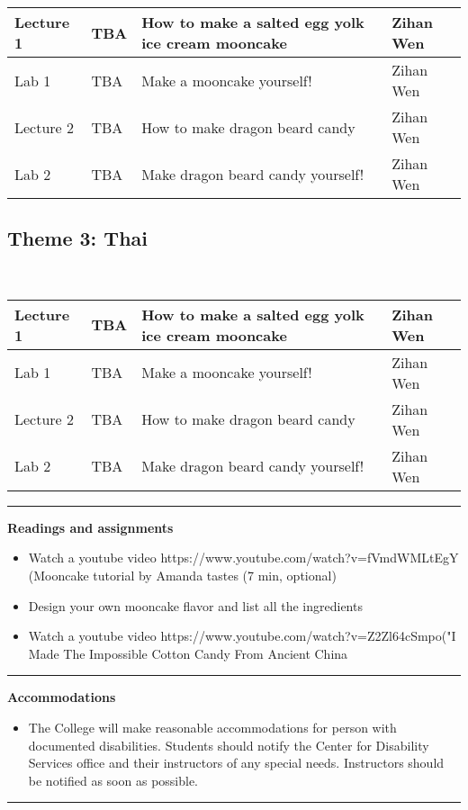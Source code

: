 \documentclass{article}
\begin{document}
 \vspace{0.5em} \begin{tabular}{|l|l|l|l|}
\hline 
Lecture 1 & TBA & How to make a salted egg yolk ice cream mooncake & Zihan Wen\\
\hline
Lab 1 & TBA & Make a mooncake yourself!& Zihan Wen\\
\hline
Lecture 2 & TBA & How to make dragon beard candy & Zihan Wen\\
\hline 
Lab 2 & TBA & Make dragon beard candy yourself!& Zihan Wen\\
\hline
\end{tabular}



 \subsection*{Theme 3: Thai }\\
 \vspace{0.5em} \begin{tabular}{|l|l|l|l|}
\hline 
Lecture 1 & TBA & How to make a salted egg yolk ice cream mooncake & Zihan Wen\\
\hline
Lab 1 & TBA & Make a mooncake yourself!& Zihan Wen\\
\hline
Lecture 2 & TBA & How to make dragon beard candy & Zihan Wen\\
\hline 
Lab 2 & TBA & Make dragon beard candy yourself!& Zihan Wen\\
\hline
\end{tabular}




 \vspace{0.5em}
  \par\noindent\rule{\textwidth}{0.4pt}
  
\noindent\textbf{Readings and assignments}
\begin{itemize}
\item Watch a youtube video https://www.youtube.com/watch?v=fVmdWMLtEgY (Mooncake tutorial by Amanda tastes (7 min, optional)
\item Design your own mooncake flavor and list all the ingredients 
\item Watch a youtube video https://www.youtube.com/watch?v=Z2Zl64cSmpo("I Made The Impossible Cotton Candy From Ancient China 
\end{itemize}
  \par\noindent\rule{\textwidth}{0.4pt}
\textbf{Accommodations }
\begin{itemize}
\vspace{0.5em} 
\item\noindent The College will make reasonable accommodations for person with documented disabilities. Students should notify the Center for Disability Services office and their instructors of any special needs. Instructors should be notified as soon as possible.

 \end{itemize}
  \par\noindent\rule{\textwidth}{0.4pt}
\end{document}
